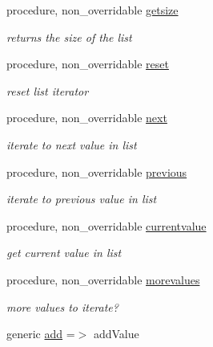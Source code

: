 \begin{DoxyCompactItemize}
procedure, non\+\_\+overridable \mbox{\hyperlink{structabstract__linkedlist__mod_1_1linkedlist_a18806ecb0fb5dea1e754de35d3700ab7}{getsize}}
\begin{DoxyCompactList}\small\item\em returns the size of the list \end{DoxyCompactList}\item 
procedure, non\+\_\+overridable \mbox{\hyperlink{structabstract__linkedlist__mod_1_1linkedlist_a3eb28d7a77ee8613ed566ec0148a1bd3}{reset}}
\begin{DoxyCompactList}\small\item\em reset list iterator \end{DoxyCompactList}\item 
procedure, non\+\_\+overridable \mbox{\hyperlink{structabstract__linkedlist__mod_1_1linkedlist_ae301aa96709e62ff823e9fd7c52ff517}{next}}
\begin{DoxyCompactList}\small\item\em iterate to next value in list \end{DoxyCompactList}\item 
procedure, non\+\_\+overridable \mbox{\hyperlink{structabstract__linkedlist__mod_1_1linkedlist_a655ba9438cdca6f2a52fd317e474fd70}{previous}}
\begin{DoxyCompactList}\small\item\em iterate to previous value in list \end{DoxyCompactList}\item 
procedure, non\+\_\+overridable \mbox{\hyperlink{structabstract__linkedlist__mod_1_1linkedlist_a01dda56c3e79f6e9f5b12df9a9ec192b}{currentvalue}}
\begin{DoxyCompactList}\small\item\em get current value in list \end{DoxyCompactList}\item 
procedure, non\+\_\+overridable \mbox{\hyperlink{structabstract__linkedlist__mod_1_1linkedlist_adac9f898125d07bacdee51f7beed0ec1}{morevalues}}
\begin{DoxyCompactList}\small\item\em more values to iterate? \end{DoxyCompactList}\item 
generic \mbox{\hyperlink{structabstract__linkedlist__mod_1_1linkedlist_a4962955d0f6e8fc46cccaa41e5f32b67}{add}} =$>$ add\+Value
\end{DoxyCompactItemize}

